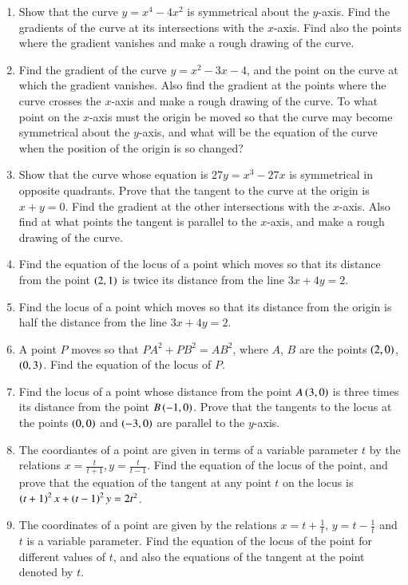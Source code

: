 \begin{enumerate}[label=\arabic*.,ref=\thesubsection.\theenumi]
\item Show that the curve $y=x^4-4x^2$ is symmetrical about the $y$-axis.  Find the gradients of the curve at its intersections
with the $x$-axis.  Find also the points where the gradient vanishes and make a rough drawing of the curve.
\item Find the gradient of the curve $y=x^2-3x-4$, and the point on the curve at which the gradient vanishes.  Also find
the gradient at the points where the curve crosses the $x$-axis and make a rough drawing of the curve.  To what
point on the $x$-axis must the origin be moved so that the curve may become symmetrical
about the $y$-axis, and what will be the equation of the curve when the position of the origin
is so changed?
\item Show that the curve whose equation is $27y=x^3-27x$ is symmetrical in opposite quadrants.  Prove that
the tangent to the curve at the origin is $x+y=0$.  Find the gradient at the other intersections with the $x$-axis.  Also
find at what points the tangent is parallel to the $x$-axis, and make a rough drawing of the curve.
\item Find the equation of the locus of a point which moves so that its distance from the point $\left(2,1\right)$
is twice its distance from the line $3x+4y=2$.
\item Find the locus of a point which moves so that its distance from the origin is half the  distance from the
line $3x+4y=2$.
\item A point $P$ moves so that $PA^2+PB^2=AB^2$, where $A$, $B$ are the points $\left(2,0\right)$, $\left(0,3\right)$.  Find the equation of the locus of $P$.
\item Find the locus of a point whose distance from the point $A\left(3,0\right)$ is three times its distance from the point $B \left(-1,0\right)$.
Prove that the tangents to the locus at the points $\left(0,0\right)$ and $\left(-3,0\right)$ are parallel to the $y$-axis.
\item The coordiantes of a point are given in terms of a variable parameter $t$ by the relations $x=\frac{t}{t+1}, y = \frac{t}{t-1}$.  Find the equation of the locus
of the point, and prove that the equation of the tangent at any point $t$
on the locus is $\left(t+1\right)^2x+\left(t-1\right)^2y=2t^2$.
\item The coordinates of a point are given by the relations $x = t + \frac{1}{t}$, $y = t - \frac{1}{t}$ and $t$ is a variable parameter.  Find the
equation of the locus of the point for different values of $t$, and also the equations of the
tangent at the point denoted by $t$.
\end{enumerate}
